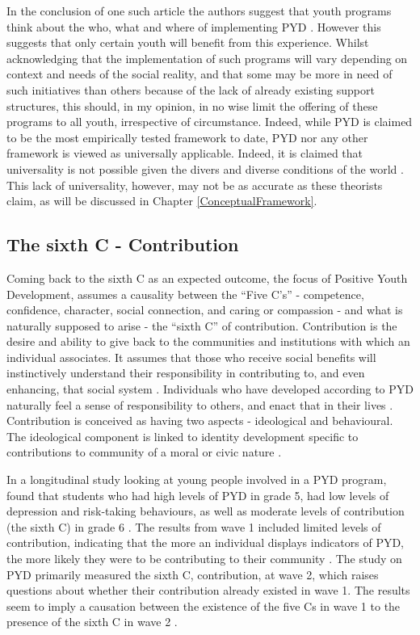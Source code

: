 In the conclusion of one such article the authors suggest that youth programs think about the who, what and where of implementing PYD \citep{Jelicic2007}. However this suggests that only certain youth will benefit from this experience. Whilst acknowledging that the implementation of such programs will vary depending on context and needs of the social reality, and that some may be more in need of such initiatives than others because of the lack of already existing support structures, this should, in my opinion, in no wise limit the offering of these programs to all youth, irrespective of circumstance. Indeed, while PYD is claimed to be the most empirically tested framework to date, PYD nor any other framework is viewed as universally applicable. Indeed, it is claimed that universality is not possible given the divers and diverse conditions of the world \citep{Lerner2011}. This lack of universality, however, may not be as accurate as these theorists claim, as will be discussed in Chapter \ref{ConceptualFramework}. 



\subsection{The sixth C - Contribution}
Coming back to the sixth C as an expected outcome, the focus of Positive Youth Development, assumes a causality between the “Five C's” - competence, confidence, character, social connection, and caring or compassion - and what is naturally supposed to arise - the “sixth C” of contribution. Contribution is the desire and ability to give back to the communities and institutions with which an individual associates. It assumes that those who receive social benefits will instinctively understand their responsibility in contributing to, and even enhancing, that social system \citep{Lerner2010}. Individuals who have developed according to PYD naturally feel a sense of responsibility to others, and enact that in their lives \citep{ForrestBank2015}. Contribution is conceived as having two aspects - ideological and behavioural. The ideological component is linked to identity development specific to contributions to community of a moral or civic nature \citep{Lerner2005,Jelicic2007}.

In a longitudinal study looking at young people involved in a PYD program, found that students who had high levels of PYD in grade 5, had low levels of depression and risk-taking behaviours, as well as moderate levels of contribution (the sixth C) in grade 6 \citep{Jelicic2007}. The results from wave 1 included limited levels of contribution, indicating that the more an individual displays indicators of PYD, the more likely they were to be contributing to their community \citep{Lerner2005}. The study on PYD primarily measured the sixth C, contribution, at wave 2, which raises questions about whether their contribution already existed in wave 1. The results seem to imply a causation between the existence of the five Cs in wave 1 to the presence of the sixth C in wave 2 \citep{Jelicic2007}. 

